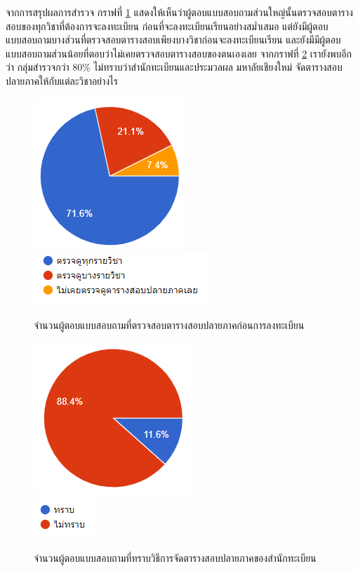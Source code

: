 จากการสรุปผลการสำรวจ กราฟที่ \ref{fig:check_before_enrollment} แสดงให้เห็นว่าผู้ตอบแบบสอบถามส่วนใหญ่นั้นตรวจสอบตารางสอบของทุกวิชาที่ต้องการจะลงทะเบียน
ก่อนที่จะลงทะเบียนเรียนอย่างสม่ำเสมอ แต่ยังมีผู้ตอบแบบสอบถามบางส่วนที่ตรวจสอบตารางสอบเพียงบางวิชาก่อนจะลงทะเบียนเรียน และยังมีมีผู้ตอบแบบสอบถามส่วนน้อยที่ตอบว่าไม่เคยตรวจสอบตารางสอบของตนเองเลย
จากกราฟที่ \ref{fig:registration_exam} เรายังพบอีกว่า กลุ่มสำรวจกว่า 80\% ไม่ทราบว่าสำนักทะเบียนและประมวลผล มหาลัยเชียงใหม่ จัดตารางสอบปลายภาคให้กับแต่ละวิชาอย่างไร
\begin{figure}
  \begin{center}
    \includegraphics{images/checking_schedule_before_enrollment.png}\\[2ex]
    \includegraphics{images/legend_for_checking_schedule_before_enrollment.png}
  \end{center}
  \caption[จำนวนผู้ตอบแบบสอบถามที่ตรวจสอบตารางสอบปลายภาคก่อนการลงทะเบียน]{จำนวนผู้ตอบแบบสอบถามที่ตรวจสอบตารางสอบปลายภาคก่อนการลงทะเบียน}
  \label{fig:check_before_enrollment}     
\end{figure}
\begin{figure}
  \begin{center}
    \includegraphics{images/registration_exam.png}\\[2ex]
    \includegraphics{images/legend_for_registration_exam.png}
  \end{center}
  \caption[จำนวนผู้ตอบแบบสอบถามที่ทราบวิธีการจัดตารางสอบปลายภาคของสำนักทะเบียน]{จำนวนผู้ตอบแบบสอบถามที่ทราบวิธีการจัดตารางสอบปลายภาคของสำนักทะเบียน}
  \label{fig:registration_exam}     
\end{figure}

